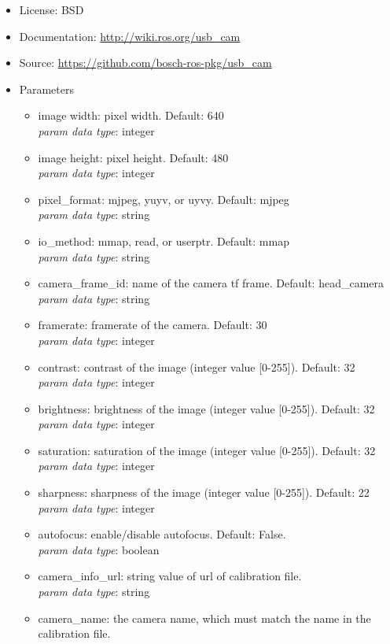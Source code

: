 \begin{itemize}
\item License: BSD
\item Documentation: \url{http://wiki.ros.org/usb_cam}
\item Source: \url{https://github.com/bosch-ros-pkg/usb_cam}
\item Parameters
\begin{itemize}
\item image width: pixel width. Default: 640\\
\textit{param data type}: integer
\item image height: pixel height. Default: 480\\
\textit{param data type}: integer
\item pixel\_format: mjpeg, yuyv, or uyvy. Default: mjpeg\\
\textit{param data type}: string
\item io\_method: mmap, read, or userptr. Default: mmap\\
\textit{param data type}: string
\item camera\_frame\_id: name of the camera tf frame. Default: head\_camera\\
\textit{param data type}: string
\item framerate: framerate of the camera. Default: 30\\
\textit{param data type}: integer
\item contrast: contrast of the image (integer value [0-255]). Default: 32\\
\textit{param data type}: integer
\item brightness: brightness of the image (integer value [0-255]). Default: 32\\
\textit{param data type}: integer
\item saturation: saturation of the image (integer value [0-255]). Default: 32\\
\textit{param data type}: integer
\item sharpness: sharpness of the image (integer value [0-255]). Default: 22\\
\textit{param data type}: integer
\item autofocus: enable/disable autofocus. Default: False.\\
\textit{param data type}: boolean
\item camera\_info\_url: string value of url of calibration file.\\
\textit{param data type}: string
\item camera\_name: the camera name, which must match the name in the calibration file.\\

\end{itemize}
\end{itemize}

